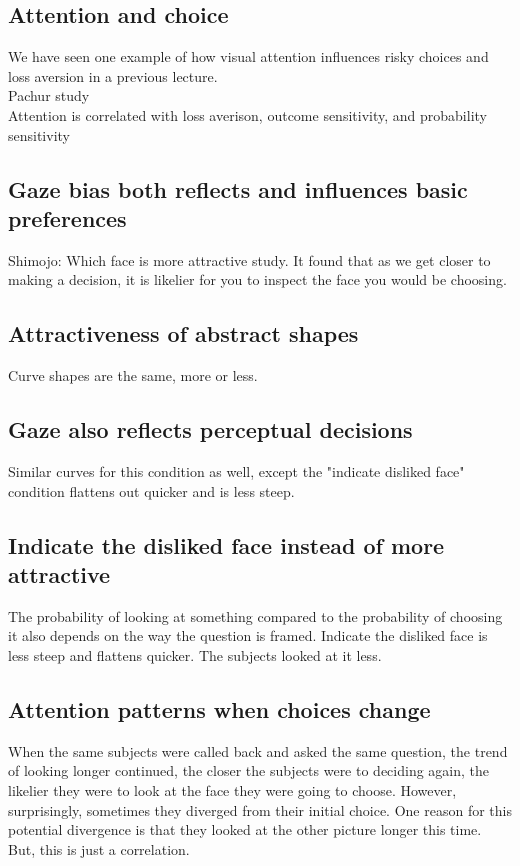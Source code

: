 \subsection{Attention and choice}
We have seen one example of how visual attention influences risky choices and loss aversion in a previous lecture.
\\Pachur study
\\Attention is correlated with loss averison, outcome sensitivity, and probability sensitivity
\subsection{Gaze bias both reflects and influences basic preferences
}
Shimojo: Which face is more attractive study. It found that as we get closer to making a decision, it is likelier for you to inspect the face you would be choosing.
\subsection{Attractiveness of abstract shapes}
Curve shapes are the same, more or less. 
\subsection{Gaze also reflects perceptual decisions}
Similar curves for this condition as well, except the "indicate disliked face" condition flattens out quicker and is less steep.

\subsection{Indicate the disliked face instead of more attractive}
The probability of looking at something compared to the probability of choosing it also depends on the way the question is framed. Indicate the disliked face is less steep and flattens quicker. The subjects looked at it less.
\subsection{Attention patterns when choices change}
When the same subjects were called back and asked the same question, the trend of looking longer continued, the closer the subjects were to deciding again, the likelier they were to look at the face they were going to choose. However, surprisingly, sometimes they diverged from their initial choice. One reason for this potential divergence is that they looked at the other picture longer this time. But, this is just a correlation.

